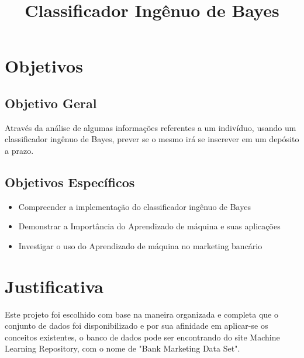 \documentclass[conference]{IEEEtran}
\begin{document}
\title{Classificador Ingênuo de Bayes}

\author{
\and
{}
\and
{}

}

\maketitle





\section{Objetivos}
\subsection{Objetivo Geral}
Através da análise de algumas informações referentes a um indivíduo, usando um classificador ingênuo de Bayes, prever se o mesmo irá se inscrever em um depósito a prazo. 
\subsection{Objetivos Específicos}
\begin{itemize}
\item Compreender a implementação do classificador ingênuo de Bayes
\item Demonstrar a Importância do Aprendizado de máquina e suas aplicações
\item Investigar o uso do Aprendizado de máquina no marketing bancário
\end{itemize}
\section{Justificativa}
Este projeto foi escolhido com base na maneira organizada e completa que o conjunto de dados  foi disponibilizado e por sua afinidade em aplicar-se os conceitos existentes, o banco de dados pode ser encontrando do site Machine Learning Repository, com o nome de "Bank Marketing Data Set"\cite{b1}.
\end{document}

